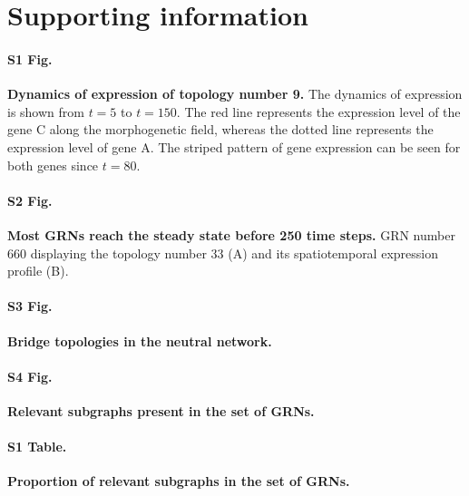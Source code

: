 \documentclass[10pt,letterpaper]{article}
\begin{document}


\section*{Supporting information}


\paragraph*{S1 Fig.}
\label{S2_Fig}
{\bf Dynamics of expression of topology number 9.}
The dynamics of expression is shown from $t = 5$ to $t = 150$. The red line
represents the expression level of the gene C along the morphogenetic field,
whereas the dotted line represents the expression level of gene A. The
striped pattern of gene expression can be seen for both genes since $t = 80$.

\paragraph*{S2 Fig.}
\label{S3_Fig}
{\bf Most GRNs reach the steady state before 250 time steps.}
GRN number 660 displaying the topology number 33 (A) and its spatiotemporal
expression profile (B).

\paragraph*{S3 Fig.}
\label{S4_Fig}
{\bf Bridge topologies in the neutral network.}

\paragraph*{S4 Fig.}
\label{S1_Fig}
{\bf Relevant subgraphs present in the set of GRNs.}

\paragraph*{S1 Table.}
\label{S1_Table}
{\bf Proportion of relevant subgraphs in the set of GRNs.}
\end{document}
